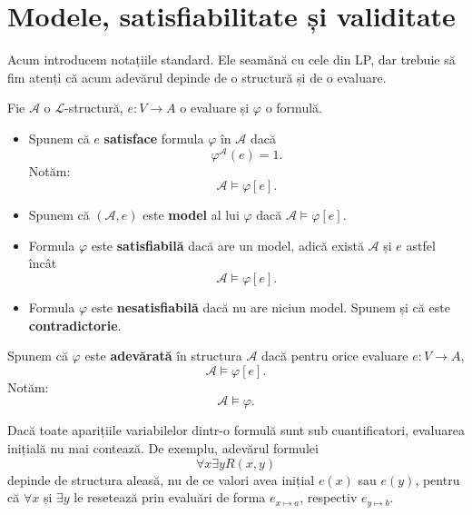 \section{Modele, satisfiabilitate și validitate}

Acum introducem notațiile standard. Ele seamănă cu cele din LP, dar trebuie să fim atenți că acum adevărul depinde de o structură și de o evaluare.

\begin{definition}
	Fie \( \mathcal{A} \) o \( \mathcal{L} \)-structură, \(e : V \to A\) o evaluare și \( \varphi \) o formulă.

	\begin{itemize}
		\item Spunem că \(e\) \textbf{satisface} formula \( \varphi \) în \( \mathcal{A} \) dacă
		      \[
			      \varphi^\mathcal{A}(e)=1.
		      \]
		      Notăm:
		      \[
			      \mathcal{A} \models \varphi[e].
		      \]

		\item Spunem că \( (\mathcal{A}, e) \) este \textbf{model} al lui \( \varphi \) dacă \( \mathcal{A} \models \varphi[e] \).

		\item Formula \( \varphi \) este \textbf{satisfiabilă} dacă are un model, adică există \( \mathcal{A} \) și \(e\) astfel încât
		      \[
			      \mathcal{A} \models \varphi[e].
		      \]

		\item Formula \( \varphi \) este \textbf{nesatisfiabilă} dacă nu are niciun model. Spunem și că este \textbf{contradictorie}.
	\end{itemize}
\end{definition}

\begin{definition}
	Spunem că \( \varphi \) este \textbf{adevărată} în structura \( \mathcal{A} \) dacă pentru orice evaluare \(e : V \to A\),
	\[
		\mathcal{A} \models \varphi[e].
	\]
	Notăm:
	\[
		\mathcal{A} \models \varphi.
	\]
\end{definition}

\begin{note}
	Dacă toate aparițiile variabilelor dintr-o formulă sunt sub cuantificatori, evaluarea inițială nu mai contează. De exemplu, adevărul formulei
	\[
		\forall x \exists y R(x,y)
	\]
	depinde de structura aleasă, nu de ce valori avea inițial \(e(x)\) sau \(e(y)\), pentru că \( \forall x \) și \( \exists y \) le resetează prin evaluări de forma
	\(e_{x \mapsto a}\), respectiv \(e_{y \mapsto b}\).
\end{note}

